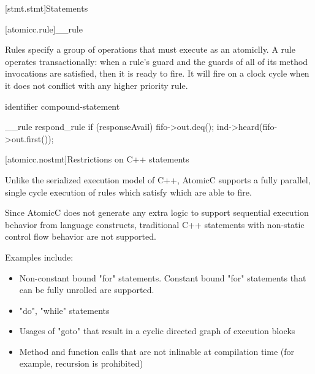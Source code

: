 [stmt.stmt]{Statements}%


[atomicc.rule]{__rule}

Rules specify a group of operations that must execute as an atomiclly.
A rule operates
transactionally: when a rule's guard and the guards of all of its
method invocations are satisfied, then it is ready to fire. It will
fire on a clock cycle when it does not conflict with any higher
priority rule.

\begin{bnf}
\br
     identifier  compound-statement\br

\end{bnf}

\begin{example}
\begin{codeblock}
     __rule respond_rule if (responseAvail) {
         fifo->out.deq();
         ind->heard(fifo->out.first());
     }
\end{codeblock}
\end{example}

[atomicc.nostmt]{Restrictions on C++ statements}

Unlike the serialized execution model of C++, AtomicC supports a fully parallel,
single cycle execution of rules which satisfy which are able to fire.

Since AtomicC does not generate any extra logic to support sequential execution behavior from
language constructs,
traditional C++ statements with non-static control flow behavior are not supported.

Examples include:
\begin{itemize}
\item Non-constant bound "for" statements.  Constant bound "for" statements that can be fully unrolled
are supported.
\item "do", "while" statements
\item Usages of "goto" that result in a cyclic directed graph of execution blocks
\item Method and function calls that are not inlinable at compilation time (for example, recursion is prohibited)
\end{itemize}

